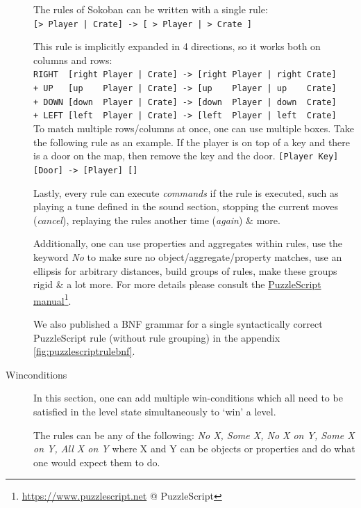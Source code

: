 \begin{description}
        The rules of Sokoban can be written with a single rule: \hfill \\
        \lstinline{[> Player | Crate] -> [ > Player | > Crate ]}
        
        This rule is implicitly expanded in 4 directions, so it works both on columns and rows:\hfill \\
        \lstinline{RIGHT  [right Player | Crate] -> [right Player | right Crate]}\hfill \\
        \lstinline{+ UP   [up    Player | Crate] -> [up    Player | up    Crate]}\hfill \\
        \lstinline{+ DOWN [down  Player | Crate] -> [down  Player | down  Crate]}\hfill \\
        \lstinline{+ LEFT [left  Player | Crate] -> [left  Player | left  Crate]}\hfill \\
        
        To match multiple rows/columns at once, one can use multiple boxes. Take the following rule as an example. If the player is on top of a key and there is a door on the map, then remove the key and the door.
    \lstinline{[Player Key] [Door] -> [Player] []}
    
        Lastly, every rule can execute \textit{commands} if the rule is executed, such as playing a tune defined in the sound section, stopping the current moves (\textit{cancel}), replaying the rules another time (\textit{again}) \& more.
        
        Additionally, one can use properties and aggregates within rules, use the keyword \textit{No} to make sure no object/aggregate/property matches, use an ellipsis for arbitrary distances, build groups of rules, make these groups rigid \& a lot more.
        For more details please consult the \href{https://www.puzzlescript.net}{PuzzleScript manual}\footnote{\url{https://www.puzzlescript.net} @ PuzzleScript}.
        
        We also published a BNF grammar for a single syntactically correct PuzzleScript rule (without rule grouping) in the appendix \autoref{fig:puzzlescriptrulebnf}.
    
    \item [Winconditions] In this section, one can add multiple win-conditions which all need to be satisfied in the level state simultaneously to `win' a level.
    
    The rules can be any of the following: \textit{No X, Some X, No X on Y, Some X on Y, All X on Y} where X and Y can be objects or properties and do what one would expect them to do.
    

\end{description}
